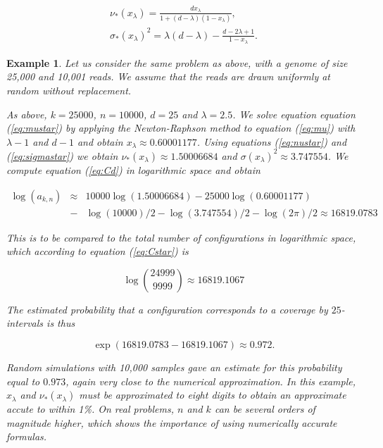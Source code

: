 \documentclass{article}
\newtheorem{example}{Example}
\begin{document}
\begin{gather}
\label{eq:nustar}
\nu_*(x_\lambda) = \frac{dx_\lambda}{1+(d-\lambda)(1-x_\lambda)}, \\
\sigma_*(x_\lambda)^2 = \lambda(d-\lambda) -
  \frac{d-2\lambda+1}{1-x_\lambda}. \label{eq:sigmastar}
\end{gather}


\begin{example}

Let us consider the same problem as above, with a genome of size 25,000
and 10,001 reads. We assume that the reads are drawn uniformly at random
without replacement.

As above, $k=25000$, $n=10000$, $d=25$ and $\lambda = 2.5$. We solve
equation equation (\ref{eq:mustar}) by applying the Newton-Raphson method
to equation (\ref{eq:mu}) with $\lambda-1$ and $d-1$ and obtain
$x_\lambda \approx 0.60001177$. Using equations (\ref{eq:nustar}) and
(\ref{eq:sigmastar}) we obtain $\nu_*(x_\lambda) \approx 1.50006684$ and
$\sigma(x_\lambda)^2 \approx 3.747554$. We compute equation
(\ref{eq:Cd}) in logarithmic space and obtain

\begin{eqnarray*}
\log(a_{k,n}) &\approx& 10000\log(1.50006684) - 25000\log(0.60001177) \\
&-& \log(10000)/2 - \log(3.747554)/2 - \log(2\pi)/2
\approx 16819.0783
\end{eqnarray*}

This is to be compared to the total number of configurations in
logarithmic space, which according to equation (\ref{eq:Cstar}) is

\begin{equation*}
\log { 24999 \choose 9999 } \approx 16819.1067
\end{equation*}

The estimated probability that a configuration corresponds to a coverage
by $25$-intervals is
thus

\begin{equation*}
\exp(16819.0783-16819.1067) \approx 0.972.
\end{equation*}

Random simulations with 10,000 samples gave an estimate for this
probability equal to $0.973$, again very close to the numerical
approximation. In this example, $x_\lambda$ and $\nu_*(x_\lambda)$ must be
approximated to eight digits to obtain an approximate accute to within
1\%. On real problems, $n$ and $k$ can be several orders of magnitude
higher, which shows the importance of using numerically accurate formulas.

\end{example}
\end{document}
